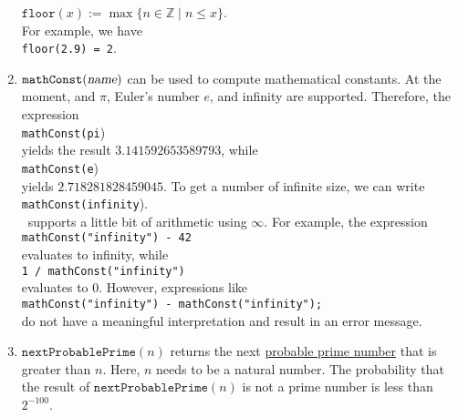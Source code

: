 \begin{enumerate}
      $\texttt{floor}(x) := \max \{ n \in \mathbb{Z} \mid n \leq x \}$.
      \\[0.2cm]
      For example, we have
      \\[0.2cm]
      \hspace*{1.3cm}
      \texttt{floor(2.9) = 2}.
\item $\texttt{mathConst}(\textsl{name})$ can be used to compute mathematical constants.
      At the moment, and $\pi$, Euler's number $e$, and infinity are supported.  Therefore, the expression
      \\[0.2cm]
      \hspace*{1.3cm}
      \texttt{mathConst(pi})
      \\[0.2cm]
      yields the result $3.141592653589793$, while
      \\[0.2cm]
      \hspace*{1.3cm}
      \texttt{mathConst(e})
      \\[0.2cm]
      yields $2.718281828459045$.  To get a number of infinite size, we can write
      \\[0.2cm]
      \hspace*{1.3cm}
      \texttt{mathConst(infinity}).
      \\[0.2cm]
      \setlx\ supports a little bit of arithmetic using $\infty$.  For example,  the expression
      \\[0.2cm]
      \hspace*{1.3cm}
      \texttt{mathConst("infinity") - 42}
      \\[0.2cm]
      evaluates to infinity, while
      \\[0.2cm]
      \hspace*{1.3cm}
      \texttt{1 / mathConst("infinity")}
      \\[0.2cm]
      evaluates to $0$.  However, expressions like
      \\[0.2cm]
      \hspace*{1.3cm}
      \texttt{mathConst("infinity") - mathConst("infinity");}
      \\[0.2cm]
      do not have a meaningful interpretation and result in an error message.
\item $\mathtt{nextProbablePrime}(n)$ returns the next 
      \href{https://en.wikipedia.org/wiki/Probable_prime}{probable prime number} that is greater than
      $n$.  Here, $n$ needs to be a natural number.   The probability that the result of 
      $\mathtt{nextProbablePrime}(n)$ is not a prime number is less than $2^{-100}$.

\end{enumerate}

